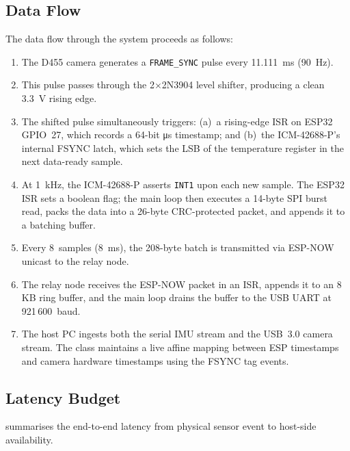 \subsection{Data Flow}

The data flow through the system proceeds as follows:
\begin{enumerate}[nosep]
  \item The D455 camera generates a \texttt{FRAME\_SYNC} pulse every \SI{11.111}{\milli\second} (\SI{90}{\hertz}).
  \item This pulse passes through the 2$\times$2N3904 level shifter, producing a clean \SI{3.3}{\volt} rising edge.
  \item The shifted pulse simultaneously triggers: (a)~a rising-edge ISR on ESP32 GPIO~27, which records a 64-bit \si{\micro\second} timestamp; and (b)~the ICM-42688-P's internal FSYNC latch, which sets the LSB of the temperature register in the next data-ready sample.
  \item At \SI{1}{\kilo\hertz}, the ICM-42688-P asserts \texttt{INT1} upon each new sample. The ESP32 ISR sets a boolean flag; the main loop then executes a 14-byte SPI burst read, packs the data into a 26-byte CRC-protected packet, and appends it to a batching buffer.
  \item Every 8~samples (\SI{8}{\milli\second}), the 208-byte batch is transmitted via ESP-NOW unicast to the relay node.
  \item The relay node receives the ESP-NOW packet in an ISR, appends it to an 8\,KB ring buffer, and the main loop drains the buffer to the USB UART at 921\,600~baud.
  \item The host PC ingests both the serial IMU stream and the USB~3.0 camera stream. The  class maintains a live affine mapping between ESP timestamps and camera hardware timestamps using the FSYNC tag events.
\end{enumerate}


\subsection{Latency Budget}

 summarises the end-to-end latency from physical sensor event to host-side availability.

